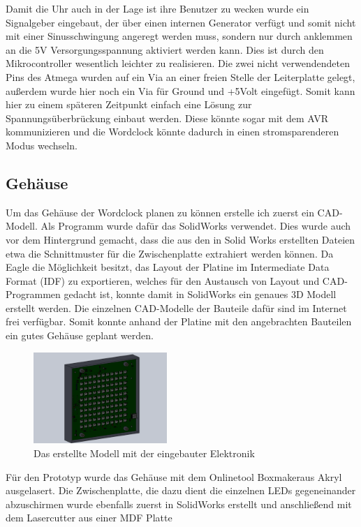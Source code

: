 \documentclass[12pt,journal,compsoc]{IEEEtran}
\begin{document}
Damit die Uhr auch in der Lage ist ihre Benutzer zu wecken wurde ein Signalgeber eingebaut, der über einen internen Generator verfügt und somit nicht mit einer Sinusschwingung angeregt werden muss, sondern nur durch anklemmen an die 5V Versorgungsspannung aktiviert werden kann. Dies ist durch den Mikrocontroller wesentlich leichter zu realisieren.
Die zwei nicht  verwendendeten Pins des Atmega wurden auf ein Via an einer freien Stelle der Leiterplatte gelegt, außerdem wurde hier noch ein Via für Ground und +5Volt eingefügt. Somit kann hier zu einem späteren Zeitpunkt einfach eine Lösung zur Spannungsüberbrückung einbaut werden. Diese könnte sogar mit dem AVR kommunizieren und die Wordclock könnte dadurch in einen stromsparenderen Modus wechseln.  


\subsection{Gehäuse}
Um das Gehäuse der Wordclock planen zu können erstelle ich zuerst ein CAD-Modell. Als Programm wurde dafür das SolidWorks verwendet. Dies wurde auch vor dem Hintergrund gemacht, dass die  aus den in Solid Works erstellten Dateien etwa die Schnittmuster für die Zwischenplatte extrahiert werden können. Da Eagle die Möglichkeit besitzt, das Layout der Platine im Intermediate Data Format  (IDF) zu exportieren, welches für den Austausch von Layout und CAD-Programmen gedacht ist, konnte damit in SolidWorks ein genaues 3D Modell erstellt werden. Die einzelnen CAD-Modelle der Bauteile dafür sind im Internet frei verfügbar. Somit konnte anhand der Platine mit den angebrachten Bauteilen ein gutes Gehäuse geplant werden. 
\begin{figure}[h]
	\centering
	\includegraphics[width=0.45\textwidth]{Bilder/SW2}
	\caption{Das erstellte Modell mit der eingebauter Elektronik} 
	\label{fig:SW2}
\end{figure}
Für den Prototyp wurde das Gehäuse mit dem Onlinetool \glqq Boxmaker\grqq aus Akryl ausgelasert. Die Zwischenplatte, die dazu dient die einzelnen LEDs gegeneinander abzuschirmen wurde ebenfalls zuerst in SolidWorks erstellt und anschließend mit dem Lasercutter aus einer MDF Platte 
\end{document}
